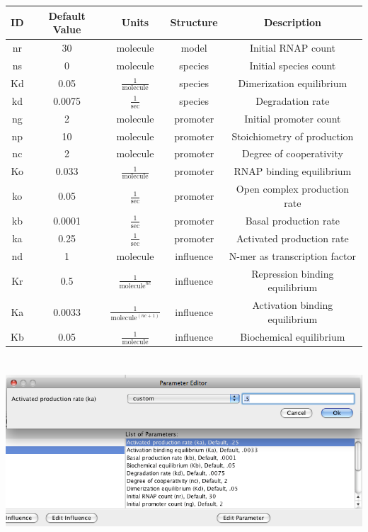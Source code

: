 \documentclass[titlepage,11pt]{article}
\begin{document}
\begin{center}
\begin{tabular}{|c|c|c|c|c|}
\hline
ID & Default Value & Units      & Structure & Description \\ \hline \hline
nr & 30            & molecule   & model     & Initial RNAP count \\ \hline
ns & 0             & molecule   & species   & Initial species count \\ \hline
Kd & 0.05          & $\frac{1}{\mathrm{molecule}}$ & species   
& Dimerization equilibrium\\ \hline
kd & 0.0075        & $\frac{1}{\mathrm{sec}}$ & species   
& Degradation rate \\ \hline
ng & 2             & molecule   & promoter  & Initial promoter count \\ \hline
np & 10            & molecule   & promoter  & Stoichiometry of
production \\ \hline
nc & 2             & molecule   & promoter  & Degree of cooperativity \\ \hline
Ko & 0.033         & $\frac{1}{\mathrm{molecule}}$ & promoter  
& RNAP binding equilibrium\\ \hline
ko & 0.05          & $\frac{1}{\mathrm{sec}}$ & promoter  
& Open complex production rate \\ \hline
kb & 0.0001        & $\frac{1}{\mathrm{sec}}$ & promoter  
& Basal production rate \\ \hline
ka & 0.25          & $\frac{1}{\mathrm{sec}}$ & promoter  
& Activated production rate\\ \hline
nd & 1             & molecule   & influence & N-mer as transcription
factor \\ \hline
Kr & 0.5           & $\frac{1}{\mathrm{molecule}^{nc}}$ & influence
& Repression binding equilibrium \\ \hline
Ka & 0.0033        & $\frac{1}{\mathrm{molecule}^{(nc+1)}}$ & influence
& Activation binding equilibrium \\ \hline
Kb & 0.05          & $\frac{1}{\mathrm{molecule}}$ & influence
& Biochemical equilibrium \\ \hline
\end{tabular}
\end{center}

\begin{center}
\includegraphics[height=70mm]{screenshots/GCMparam}
\end{center}
\end{document}
